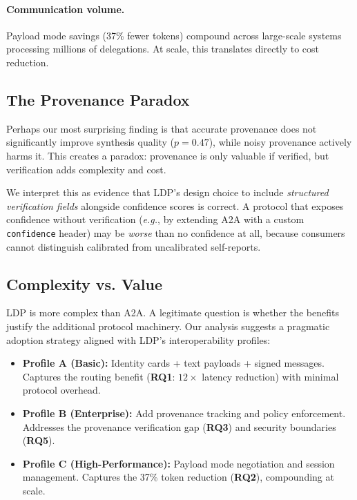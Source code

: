 \documentclass[11pt,a4paper]{article}
\newcommand{\ldp}{\textsc{LDP}}
\newcommand{\atoa}{\textsc{A2A}}
\newcommand{\eg}{\textit{e.g.}}
\newcommand{\RQ}[1]{\textbf{RQ#1}}
\begin{document}
\paragraph{Communication volume.} Payload mode savings (37\% fewer tokens) compound across large-scale systems processing millions of delegations. At scale, this translates directly to cost reduction.

\subsection{The Provenance Paradox}

Perhaps our most surprising finding is that accurate provenance does not significantly improve synthesis quality ($p{=}0.47$), while noisy provenance actively harms it. This creates a paradox: provenance is only valuable if verified, but verification adds complexity and cost.

We interpret this as evidence that \ldp{}'s design choice to include \emph{structured verification fields} alongside confidence scores is correct. A protocol that exposes confidence without verification (\eg{}, by extending \atoa{} with a custom \texttt{confidence} header) may be \emph{worse} than no confidence at all, because consumers cannot distinguish calibrated from uncalibrated self-reports.

\subsection{Complexity vs. Value}

\ldp{} is more complex than \atoa{}. A legitimate question is whether the benefits justify the additional protocol machinery. Our analysis suggests a pragmatic adoption strategy aligned with \ldp{}'s interoperability profiles:

\begin{itemize}[leftmargin=*]
\item \textbf{Profile A (Basic):} Identity cards + text payloads + signed messages. Captures the routing benefit (\RQ{1}: $12\times$ latency reduction) with minimal protocol overhead.
\item \textbf{Profile B (Enterprise):} Add provenance tracking and policy enforcement. Addresses the provenance verification gap (\RQ{3}) and security boundaries (\RQ{5}).
\item \textbf{Profile C (High-Performance):} Payload mode negotiation and session management. Captures the 37\% token reduction (\RQ{2}), compounding at scale.
\end{itemize}
\end{document}
